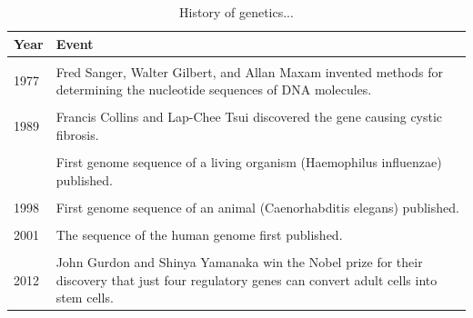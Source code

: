 \documentclass[11pt,ignorenonframetext,aspectratio=169]{beamer}
\begin{document}
\begin{frame}{}
\protect\hypertarget{section-11}{}
\begin{table}

\caption{\label{tab:history-table3}History of genetics...}
\centering
\fontsize{8}{10}\selectfont
\begin{tabular}[t]{l>{\raggedright\arraybackslash}p{40em}}
\toprule
Year & Event\\
\midrule
\cellcolor{gray!6}{1968} & \cellcolor{gray!6}{Motoo Kimura proposed the neutral theory of molecular evolution.}\\
1977 & Fred Sanger, Walter Gilbert, and Allan Maxam invented methods for determining the nucleotide sequences of DNA molecules.\\
\cellcolor{gray!6}{1980} & \cellcolor{gray!6}{Christiane Nüsslein-Volhard and Eric F. Wieschaus defined the complex of genes that regulate body plan development in Drosophila.}\\
1989 & Francis Collins and Lap-Chee Tsui discovered the gene causing cystic fibrosis.\\
\cellcolor{gray!6}{1993} & \cellcolor{gray!6}{Victor Ambrose and colleagues described the first microRNA.}\\
\addlinespace
1995 & First genome sequence of a living organism (Haemophilus influenzae) published.\\
\cellcolor{gray!6}{1996} & \cellcolor{gray!6}{First genome sequence of a eukaryote (Saccharomyces cerevisiae) published.}\\
1998 & First genome sequence of an animal (Caenorhabditis elegans) published.\\
\cellcolor{gray!6}{2000} & \cellcolor{gray!6}{First genome sequence of a plant (Arabidopsis thaliana) published.}\\
2001 & The sequence of the human genome first published.\\
\addlinespace
\cellcolor{gray!6}{2006} & \cellcolor{gray!6}{Andrew Fire and Craig Mello win the Nobel prize for their discovery of gene silencing by double-stranded RNA.}\\
2012 & John Gurdon and Shinya Yamanaka win the Nobel prize for their discovery that just four regulatory genes can convert adult cells into stem cells.\\
\bottomrule
\end{tabular}
\end{table}
\end{frame}
\end{document}
